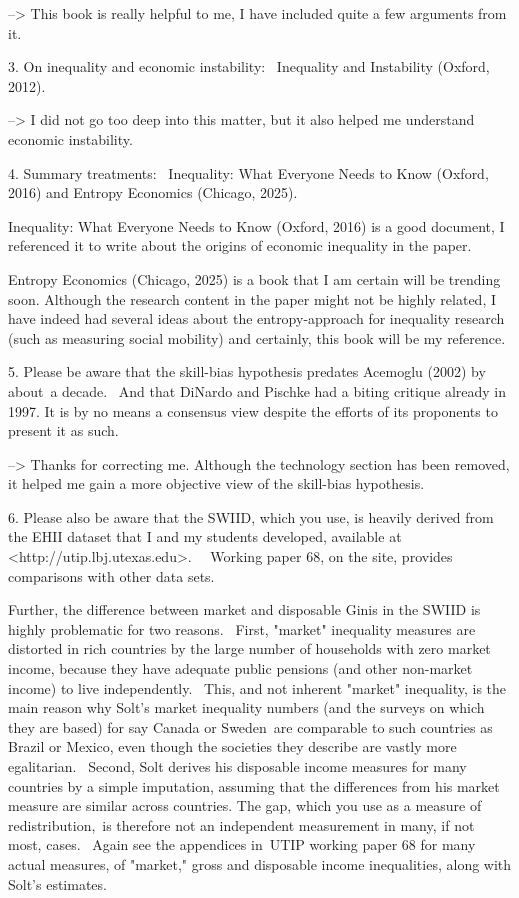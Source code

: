 --> This book is really helpful to me, I have included quite a few arguments from it.

3. On inequality and economic instability:  Inequality and Instability (Oxford, 2012). 

--> I did not go too deep into this matter, but it also helped me understand economic instability.

4. Summary treatments:  Inequality: What Everyone Needs to Know (Oxford, 2016) and Entropy Economics (Chicago, 2025). 

Inequality: What Everyone Needs to Know (Oxford, 2016) is a good document, I referenced it to write about the origins of economic inequality in the paper.

Entropy Economics (Chicago, 2025) is a book that I am certain will be trending soon. Although the research content in the paper might not be highly related, I have indeed had several ideas about the entropy-approach for inequality research (such as measuring social mobility) and certainly, this book will be my reference.

5. Please be aware that the skill-bias hypothesis predates Acemoglu (2002) by about a decade.  And that DiNardo and Pischke had a biting critique already in 1997. It is by no means a consensus view despite the efforts of its proponents to present it as such.

--> Thanks for correcting me. Although the technology section has been removed, it helped me gain a more objective view of the skill-bias hypothesis.

6. Please also be aware that the SWIID, which you use, is heavily derived from the EHII dataset that I and my students developed, available at <http://utip.lbj.utexas.edu>.   Working paper 68, on the site, provides comparisons with other data sets. 

Further, the difference between market and disposable Ginis in the SWIID is highly problematic for two reasons.  First, "market" inequality measures are distorted in rich countries by the large number of households with zero market income, because they have adequate public pensions (and other non-market income) to live independently.  This, and not inherent "market" inequality, is the main reason why Solt's market inequality numbers (and the surveys on which they are based) for say Canada or Sweden are comparable to such countries as Brazil or Mexico, even though the societies they describe are vastly more egalitarian.  Second, Solt derives his disposable income measures for many countries by a simple imputation, assuming that the differences from his market measure are similar across countries. The gap, which you use as a measure of redistribution, is therefore not an independent measurement in many, if not most, cases.  Again see the appendices in UTIP working paper 68 for many actual measures, of "market," gross and disposable income inequalities, along with Solt's estimates. 

